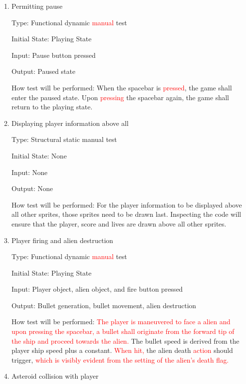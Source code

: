 \documentclass[12pt, titlepage]{article}
\begin{document}
\begin{enumerate}

\item{Permitting pause\\}

Type: Functional dynamic \textcolor{red}{manual} test

Initial State: Playing State

Input: Pause button pressed

Output: Paused state

How test will be performed: When the spacebar is \textcolor{red}{pressed}, the game shall enter the paused state. Upon \textcolor{red}{pressing} the spacebar again, the game shall return to the playing state.

\item{Displaying player information above all\\}

Type: Structural static manual test

Initial State: None

Input: None

Output: None

How test will be performed: For the player information to be displayed above all other sprites, those sprites need to be drawn last. Inspecting the code will ensure that the player, score and lives are drawn above all other sprites.

\item{Player firing and alien destruction\\}

Type: Functional dynamic \textcolor{red}{manual} test

Initial State: Playing State

Input: Player object, alien object, and fire button pressed

Output: Bullet generation, bullet movement, alien destruction

How test will be performed: \textcolor{red}{The player is maneuvered to face a alien and upon pressing the spacebar, a bullet shall originate from the forward tip of the ship and proceed towards the alien.} The bullet speed is derived from the player ship speed plus a constant. \textcolor{red}{When hit,} the alien death \textcolor{red}{action} should trigger, \textcolor{red}{which is visibly evident from the setting of the alien's death flag.}

\item{Asteroid collision with player\\}


\end{enumerate}
\end{document}
